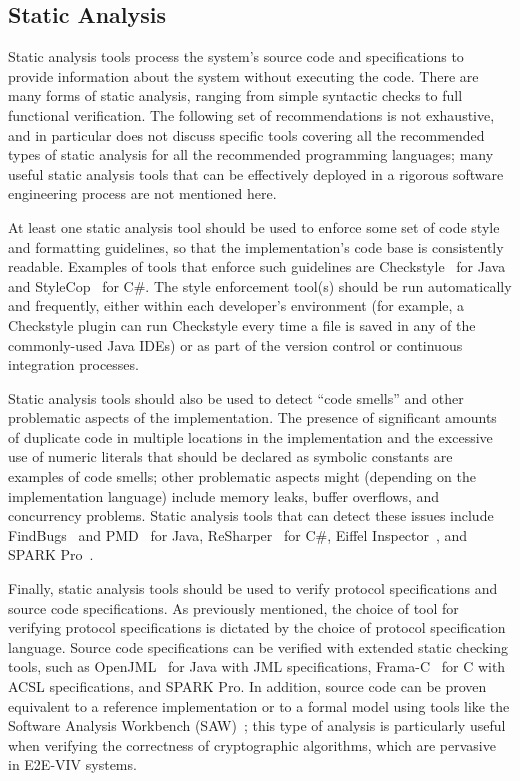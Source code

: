 \subsection{Static Analysis}

Static analysis tools process the system's source code and
specifications to provide information about the system without
executing the code.  There are many forms of static analysis, ranging
from simple syntactic checks to full functional verification. The
following set of recommendations is not exhaustive, and in particular
does not discuss specific tools covering all the recommended types of
static analysis for all the recommended programming languages; many
useful static analysis tools that can be effectively deployed in a
rigorous software engineering process are not mentioned here.

At least one static analysis tool should be used to enforce some set
of code style and formatting guidelines, so that the implementation's
code base is consistently readable. Examples of tools that enforce
such guidelines are Checkstyle~\cite{Checkstyle} for Java and
StyleCop~\cite{StyleCop} for C\#. The style enforcement tool(s) should
be run automatically and frequently, either within each developer's
environment (for example, a Checkstyle plugin can run Checkstyle every
time a file is saved in any of the commonly-used Java IDEs) or as part
of the version control or continuous integration processes.

Static analysis tools should also be used to detect ``code smells''
and other problematic aspects of the implementation. The presence of
significant amounts of duplicate code in multiple locations in the
implementation and the excessive use of numeric literals that should
be declared as symbolic constants are examples of code smells; other
problematic aspects might (depending on the implementation language)
include memory leaks, buffer overflows, and concurrency problems.
Static analysis tools that can detect these issues include
FindBugs~\cite{FindBugs} and PMD~\cite{PMD} for Java,
ReSharper~\cite{ReSharper} for C\#, Eiffel
Inspector~\cite{EiffelInspector}, and SPARK Pro~\cite{SPARKPro}.

Finally, static analysis tools should be used to verify protocol
specifications and source code specifications. As previously
mentioned, the choice of tool for verifying protocol specifications is
dictated by the choice of protocol specification language. Source code
specifications can be verified with extended static checking tools,
such as OpenJML~\cite{OpenJML} for Java with JML specifications,
Frama-C~\cite{Frama-C} for C with ACSL specifications, and SPARK
Pro. In addition, source code can be proven equivalent to a reference
implementation or to a formal model using tools like the Software
Analysis Workbench (SAW)~\cite{SAW}; this type of analysis is
particularly useful when verifying the correctness of cryptographic
algorithms, which are pervasive in E2E-VIV systems.

